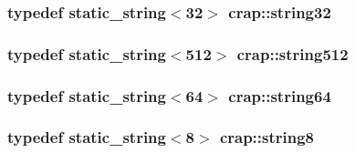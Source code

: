 \hypertarget{namespacecrap_a9dbe4066627ef2d677c31e9312ae0778}{
\subsubsection[{string32}]{\setlength{\rightskip}{0pt plus 5cm}typedef {\bf static\-\_\-string}$<$32$>$ {\bf crap\-::string32}}}\label{namespacecrap_a9dbe4066627ef2d677c31e9312ae0778}
\hypertarget{namespacecrap_ac5fc39b42209e388d9ebe20d07ad5e15}{
\subsubsection[{string512}]{\setlength{\rightskip}{0pt plus 5cm}typedef {\bf static\-\_\-string}$<$512$>$ {\bf crap\-::string512}}}\label{namespacecrap_ac5fc39b42209e388d9ebe20d07ad5e15}
\hypertarget{namespacecrap_a502636a1c5819e8500d07deed797ef9f}{
\subsubsection[{string64}]{\setlength{\rightskip}{0pt plus 5cm}typedef {\bf static\-\_\-string}$<$64$>$ {\bf crap\-::string64}}}\label{namespacecrap_a502636a1c5819e8500d07deed797ef9f}
\hypertarget{namespacecrap_af81ccb9ee7f78a006a2cde6a0eb8d5d7}{
\subsubsection[{string8}]{\setlength{\rightskip}{0pt plus 5cm}typedef {\bf static\-\_\-string}$<$8$>$ {\bf crap\-::string8}}}\label{namespacecrap_af81ccb9ee7f78a006a2cde6a0eb8d5d7}


